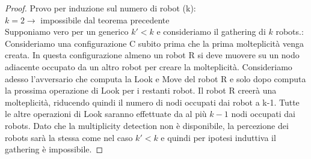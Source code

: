 \begin{proof}
    Provo per induzione sul numero di robot (k):\\
    $k = 2 \rightarrow $ impossibile dal teorema precedente\\
    Supponiamo vero per un generico $k'< k$ e consideriamo il gathering di $k$
    robots.:\\
    Consideriamo una configurazione C subito prima che la prima molteplicità venga
    creata. In questa configurazione almeno un robot R si deve muovere su un nodo
    adiacente occupato da un altro robot per creare la molteplicità. Consideriamo
    adesso l'avversario che computa la Look e Move del robot R e solo dopo computa
    la prossima operazione di Look per i restanti robot. Il robot R creerà una
    molteplicità, riducendo quindi il numero di nodi occupati dai robot a k-1. Tutte
    le altre operazioni di Look saranno effettuate da al più $k-1$ nodi occupati dai
    robots. Dato che la multiplicity detection non è disponibile, la percezione dei
    robots sarà la stessa come nel caso $k'<k$ e quindi per ipotesi induttiva il
    gathering è impossibile.

\end{proof}

